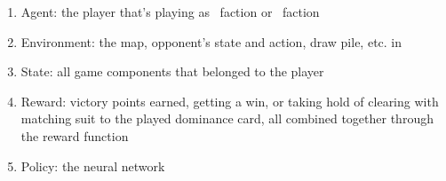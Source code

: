 \begin{enumerate}
  \item Agent: the player that's playing as \Marquise \ faction or \Eyrie \ faction
  \item Environment: the map, opponent's state and action, draw pile, etc. in \RootOurs %
  \item State: all game components that belonged to the player
  \item Reward: victory points earned, getting a win, or taking hold of clearing with matching suit to the played dominance card, all combined together through the reward function 
  \item Policy: the neural network
\end{enumerate}

